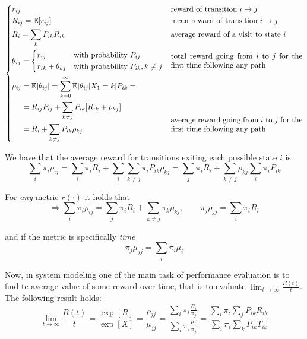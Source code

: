 \begin{equation*}
	\begin{dcases}
		r_{ij} & \text{reward of transition } i\rightarrow j \\
		R_{ij} = \exp[r_{ij}] & \text{mean reward of transition } i\rightarrow j\\
		R_i = \sum_k P_{ik} R_{ik} & \text{average reward of a visit to state } i\\
		\theta_{ij} =
			\begin{dcases}
				r_{ij} &\text{with probability } P_{ij}\\
				r_{ik}+\theta_{kj} &\text{with probability } P_{ik}, k\neq j
			\end{dcases}
			& \parbox[c]{.5\textwidth}{total reward going from $i$ to $j$ for the first time following any path} \\
			\begin{aligned}[b]
				\rho_{ij} &= \exp[\theta_{ij}] = \sum_{k=0}^{\infty}\exp[\theta_{ij}| X_1=k] P_{ik} =\\
				&= R_{ij}P_{ij} +\sum_{k \neq j} P_{ik} [R_{ik}+\rho_{kj}] \\
				&= R_i + \sum_{k \neq j}P_{ik}\rho_{kj}
			\end{aligned} & \parbox[b]{.5\textwidth}{average reward going from $i$ to $j$ for the first time following any path}
	\end{dcases}
\end{equation*}

We have that the average reward for transitions exiting each possible state $i$ is
\begin{equation*}
\sum_i \pi_i \rho_{ij} = \sum_i \pi_i R_i + \sum_i \sum_{k \neq j} \pi_i P_{ik} \rho_{kj} = \sum_j \pi_i R_i + \sum_{k \neq j}\rho_{kj}\sum_i\pi_i P_{ik}
\end{equation*}

For \emph{any} metric $r(\cdot)$ it holds that
\begin{equation}
\Rightarrow\sum_i \pi_i \rho_{ij} = \sum_j \pi_i R_i + \sum_{k \neq j}\pi_k\rho_{kj},\qquad \pi_j\rho_{jj} = \sum_i \pi_i R_i
\end{equation}

and if the metric is specifically \emph{time}
\begin{equation}
\pi_j \mu_{jj} = \sum_i \pi_i \mu_i
\end{equation}

Now, in system modeling one of the main task of performance evaluation is to find te average value of some reward over time, that is to evaluate $\lim_{t \to \infty}\frac{R(t)}{t}$. The following result holds:
\begin{equation}
\lim_{t \to \infty}\frac{R(t)}{t} = \frac{\exp[R]}{\exp[X]} = \frac{\rho_{jj}}{\mu_{jj}} = \frac{\sum_i \pi_i \frac{R_i}{\pi_j}}{\sum_i \pi_i \frac{\mu_i}{\pi_j}} = \frac{\sum_i \pi_i \sum_j P_{ik} R_{ik}}{\sum_i \pi_i \sum_k P_{ik}T_{ik}}
\end{equation}


